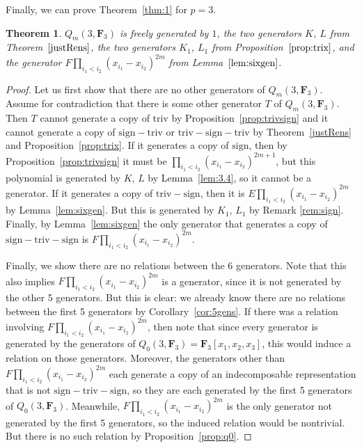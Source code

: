 \documentclass[pdftex]{sigma}
\newtheorem{Theorem}{Theorem}[section]
\theoremstyle{definition}
\numberwithin{equation}{section}
\newcommand{\triv}{\mathrm{triv}}
\newcommand{\sign}{\mathrm{sign}}
\newcommand{\trix}{\mathrm{triv-sign-triv}}
\newcommand{\six}{\mathrm{sign-triv-sign}}
\newcommand{\siv}{\mathrm{sign-triv}}
\newcommand{\tign}{\mathrm{triv-sign}}
\begin{document}
 Finally, we can prove Theorem~\ref{thm:1} for $p=3$.

 \begin{Theorem}
 $Q_m(3,\mathbf{F}_3)$ is freely generated by $1$, the two generators $K$, $L$ from Theorem~$\ref{justRens}$, the two generators $K_1$, $L_1$ from Proposition~$\ref{prop:trix}$, and the generator $F\prod_{i_1<i_2}(x_{i_1}-x_{i_2})^{2m}$ from Lemma~$\ref{lem:sixgen}$.
 \end{Theorem}

 \begin{proof}
 Let us first show that there are no other generators of $Q_m(3,\mathbf{F}_3)$. Assume for contradiction that there is some other generator $T$ of $Q_m(3,\mathbf{F}_3)$. Then $T$ cannot generate a copy of $\triv$ by Proposition~\ref{prop:trivsign} and it cannot generate a copy of $\siv$ or $\trix$ by Theorem~\ref{justRens} and Proposition~\ref{prop:trix}. If it generates a copy of $\sign$, then by Proposition~\ref{prop:trivsign} it must be $\prod_{i_1<i_2}(x_{i_1}-x_{i_2})^{2m+1}$, but this polynomial is generated by $K$, $L$ by Lemma~\ref{lem:3.4}, so it cannot be a generator. If it generates a copy of $\tign$, then it is $E\prod_{i_1<i_2}(x_{i_1}-x_{i_2})^{2m}$ by Lemma~\ref{lem:sixgen}. But this is generated by $K_1$, $L_1$ by Remark \ref{rem:sign}. Finally, by Lemma~\ref{lem:sixgen} the only generator that generates a copy of $\six$ is $F\prod_{i_1<i_2}(x_{i_1}-x_{i_2})^{2m}$.

 Finally, we show there are no relations between the 6 generators. Note that this also implies $F\prod_{i_1<i_2}(x_{i_1}-x_{i_2})^{2m}$ is a generator, since it is not generated by the other 5 generators. But this is clear: we already know there are no relations between the first 5 generators by Corollary~\ref{cor:5gens}. If there was a relation involving $F\prod_{i_1<i_2}(x_{i_1}-x_{i_2})^{2m}$, then note that since every generator is generated by the generators of $Q_0(3,\mathbf{F}_3)=\mathbf{F}_3[x_1,x_2,x_3]$, this would induce a relation on those generators. Moreover, the generators other than $F\prod_{i_1<i_2}(x_{i_1}-x_{i_2})^{2m}$ each generate a copy of an indecomposable representation that is not $\six$, so they are each generated by the first 5 generators of $Q_0(3,\mathbf{F}_3)$. Meanwhile, $F\prod_{i_1<i_2}(x_{i_1}-x_{i_2})^{2m}$ is the only generator not generated by the first 5 generators, so the induced relation would be nontrivial. But there is no such relation by Proposition~\ref{prop:q0}.
 \end{proof}
\end{document}
